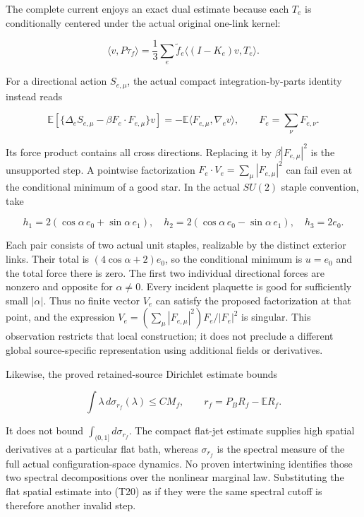 \documentclass[
  11pt,
]{article}
\begin{document}
The complete current enjoys an exact dual estimate because each \(T_e\)
is conditionally centered under the actual original one-link kernel:

\[
 \langle v,P\tau_f\rangle
 =\frac13\sum_e\widetilde f_e
       \langle(I-K_e)v,T_e\rangle.
 \tag{T18}
\]

For a directional action \(S_{e,\mu}\), the actual compact
integration-by-parts identity instead reads

\[
 \mathbb E\left[
  \{\Delta_eS_{e,\mu}-\beta F_e\cdot F_{e,\mu}\}v\right]
 =-\mathbb E\langle F_{e,\mu},\nabla_ev\rangle,
 \qquad F_e=\sum_\nu F_{e,\nu}.
 \tag{T19}
\]

Its force product contains all cross directions. Replacing it by
\(\beta|F_{e,\mu}|^2\) is the unsupported step. A pointwise
factorization \(F_e\cdot V_e=\sum_\mu|F_{e,\mu}|^2\) can fail even at
the conditional minimum of a good star. In the actual \(SU(2)\) staple
convention, take

\[
 h_1=2(\cos\alpha\,e_0+\sin\alpha\,e_1),\quad
 h_2=2(\cos\alpha\,e_0-\sin\alpha\,e_1),\quad h_3=2e_0.
\]

Each pair consists of two actual unit staples, realizable by the
distinct exterior links. Their total is \((4\cos\alpha+2)e_0\), so the
conditional minimum is \(u=e_0\) and the total force there is zero. The
first two individual directional forces are nonzero and opposite for
\(\alpha\ne0\). Every incident plaquette is good for sufficiently small
\(|\alpha|\). Thus no finite vector \(V_e\) can satisfy the proposed
factorization at that point, and the expression
\(V_e=(\sum_\mu|F_{e,\mu}|^2)F_e/|F_e|^2\) is singular. This observation
restricts that local construction; it does not preclude a different
global source-specific representation using additional fields or
derivatives.

Likewise, the proved retained-source Dirichlet estimate bounds

\[
 \int\lambda\,d\sigma_{r_f}(\lambda)\le CM_f,
 \qquad r_f=P_BR_f-\mathbb ER_f.
 \tag{T20}
\]

It does not bound \(\int_{(0,1]}d\sigma_{r_f}\). The compact flat-jet
estimate supplies high spatial derivatives at a particular flat bath,
whereas \(\sigma_{r_f}\) is the spectral measure of the full actual
configuration-space dynamics. No proven intertwining identifies those
two spectral decompositions over the nonlinear marginal law.
Substituting the flat spatial estimate into (T20) as if they were the
same spectral cutoff is therefore another invalid step.
\end{document}

